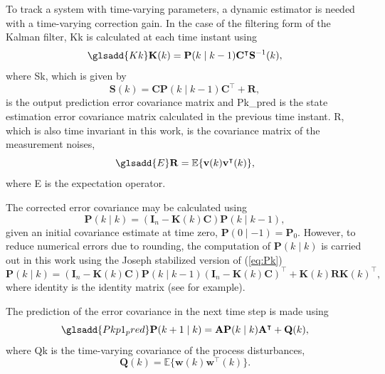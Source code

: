 To track a system with time-varying parameters, a dynamic estimator is needed with a time-varying correction gain. In the case of the filtering form of the Kalman filter, \gls{Kk} is calculated at each time instant using
\begin{equation} \label{eq:Kk}
	\glsadd{Kk}\mathbf{K}(k) = \mathbf{P}(k \mid k-1)\mathbf{C}^\intercal \mathbf{S}^{-1}(k),
\end{equation}
where \gls{Sk}, which is given by
\begin{equation} \label{eq:Sk}
	\mathbf{S}(k) = \mathbf{C}\mathbf{P}(k \mid k-1)\mathbf{C}^\intercal + \mathbf{R},
\end{equation}
is the output prediction error covariance matrix and \gls{Pk_pred} is the state estimation error covariance matrix calculated in the previous time instant. \gls{R}, which is also time invariant in this work, is the covariance matrix of the measurement noises,
\begin{equation} \label{eq:R} \glsadd{E}
	\mathbf{R} = \mathbb{E}\{ \mathbf{v}(k) \mathbf{v}^\intercal(k) \},
\end{equation}
where \gls{E} is the expectation operator.

The corrected error covariance may be calculated using
\begin{equation} \label{eq:Pk}
	\mathbf{P}(k \mid k) = \left( \mathbf{I}_n - \mathbf{K}(k) \mathbf{C} \right) \mathbf{P}(k \mid k-1),
\end{equation}
given an initial covariance estimate at time zero, $\mathbf{P}(0 \mid -1)=\mathbf{P}_0$. However, to reduce numerical errors due to rounding, the computation of $\mathbf{P}(k \mid k)$ is carried out in this work using the Joseph stabilized version of (\ref{eq:Pk})
 \begin{equation} \label{eq:Pk-stab}
 	\mathbf{P}(k \mid k) = \left( \mathbf{I}_n - \mathbf{K}(k) \mathbf{C} \right ) \mathbf{P}(k \mid k-1) \left( \mathbf{I}_n - \mathbf{K}(k) \mathbf{C} \right )^\intercal + \mathbf{K}(k)  \mathbf{R} \mathbf{K}(k)^\intercal,
 \end{equation}
where \gls{identity} is the identity matrix (see \cite{lewis_optimal_2008} for example).

The prediction of the error covariance in the next time step is made using
\begin{equation} \label{eq:Pkp1} \glsadd{Pkp1_pred}
	\mathbf{P}(k+1 \mid k) = \mathbf{A} \mathbf{P}(k \mid k)  \mathbf{A}^\intercal  + \mathbf{Q}(k),
\end{equation}
where \gls{Qk} is the time-varying covariance of the process disturbances,
\begin{equation} \label{eq:Q}
	\mathbf{Q}(k) = \mathbb{E}\{ \mathbf{w}(k) \mathbf{w}^\intercal(k) \}.
\end{equation}

